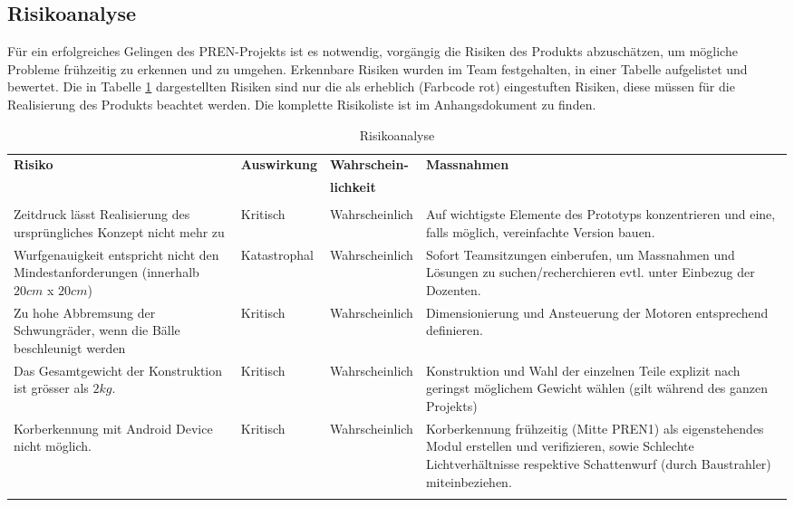 \subsection{Risikoanalyse}
Für ein erfolgreiches Gelingen des PREN-Projekts ist es notwendig, vorgängig die 
Risiken des Produkts abzuschätzen, um mögliche Probleme frühzeitig zu erkennen 
und zu umgehen. Erkennbare Risiken wurden im Team festgehalten, in einer Tabelle 
aufgelistet und bewertet. Die in Tabelle \ref{tab:RisikoanalyseTabelle} dargestellten Risiken sind nur die als erheblich 
(Farbcode rot) eingestuften Risiken, diese müssen für die Realisierung des Produkts beachtet 
werden. Die komplette Risikoliste ist im Anhangsdokument zu finden.\\
%
 \begin{longtable}{p{4cm} l l p{5.5cm}}
 	\textbf{Risiko} & \textbf{Auswirkung} & \textbf{Wahrschein-} & \textbf{Massnahmen} \\
 	                &                     & \textbf{lichkeit}    & \\	     
 	\hline & & & \\
 	\endhead
	\rule{0pt}{12pt}Zeitdruck lässt Realisierung des ursprüngliches Konzept nicht mehr zu &
	Kritisch & Wahrscheinlich & Auf wichtigste Elemente des Prototyps konzentrieren und eine, 
	falls möglich, vereinfachte Version bauen. \\
	
	\rule{0pt}{12pt}Wurfgenauigkeit entspricht nicht den Mindestanforderungen 
	(innerhalb $20 cm$ x $20 cm$) & Katastrophal & Wahrscheinlich & Sofort Teamsitzungen 
	einberufen, um Massnahmen und Lösungen zu suchen/recherchieren evtl. unter Einbezug der 
	Dozenten.\\
	
	\rule{0pt}{12pt}Zu hohe Abbremsung der Schwungräder, wenn die Bälle beschleunigt werden & 
	Kritisch & Wahrscheinlich & Dimensionierung und Ansteuerung der Motoren entsprechend 
	definieren.\\
	
	\rule{0pt}{12pt}Das Gesamtgewicht der Konstruktion ist grösser als $2 kg$. & Kritisch & 
	Wahrscheinlich & Konstruktion und Wahl der einzelnen Teile explizit nach geringst 
	möglichem Gewicht wählen (gilt während des ganzen Projekts)\\
	
	\rule{0pt}{12pt}Korberkennung mit Android Device nicht möglich. & Kritisch & Wahrscheinlich &
	 Korberkennung frühzeitig (Mitte PREN1) als eigenstehendes Modul erstellen und 
	 verifizieren, sowie Schlechte Lichtverhältnisse respektive Schattenwurf (durch Baustrahler) 
	 miteinbeziehen.\\
 	\caption{Risikoanalyse}
 	\label{tab:RisikoanalyseTabelle}
 \end{longtable}
